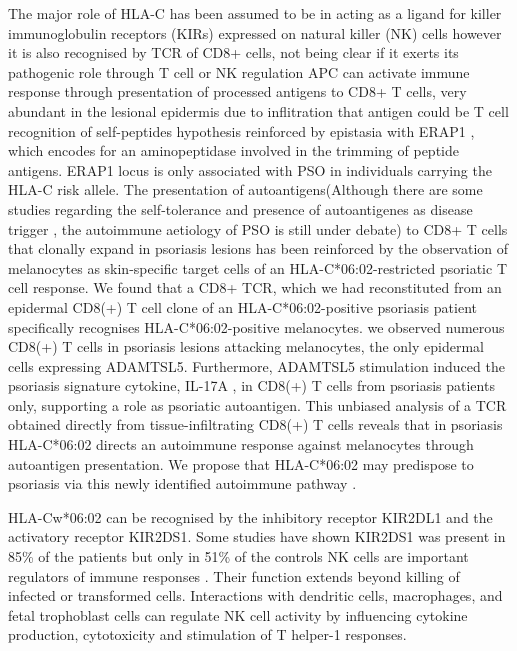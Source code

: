  The major role of HLA-C has been assumed to be in acting as a ligand for killer immunoglobulin receptors (KIRs) expressed on natural killer (NK) cells however it is also recognised by TCR of CD8+ cells, not being clear if it exerts its pathogenic role through T cell or NK regulation 
APC can activate immune response through presentation of processed antigens to CD8+ T cells, very abundant in the lesional epidermis due to inflitration that antigen could be T cell recognition of self-peptides hypothesis reinforced by epistasia with ERAP1 \parencite{Strange2010}, which encodes for an aminopeptidase involved in the trimming of peptide antigens. ERAP1  locus  is  only  associated  with  PSO  in  individuals carrying the HLA-C risk allele. The presentation of autoantigens(Although there are some studies regarding the self-tolerance and presence of autoantigenes as disease trigger \parencite{Lande2007}, the autoimmune aetiology of PSO is still under debate) to CD8+ T cells that clonally expand in psoriasis lesions has been reinforced by the observation of melanocytes as skin-specific target cells of an HLA-C*06:02-restricted psoriatic T cell response. We found that a CD8+ TCR, which we had reconstituted from an epidermal CD8(+) T cell clone of an HLA-C*06:02-positive psoriasis patient specifically recognises HLA-C*06:02-positive melanocytes. we observed numerous CD8(+) T cells in psoriasis lesions attacking melanocytes, the only epidermal cells expressing ADAMTSL5. Furthermore, ADAMTSL5 stimulation induced the psoriasis signature cytokine, IL-17A %
, in CD8(+) T cells from psoriasis patients only, supporting a role as psoriatic autoantigen. %
This unbiased analysis of a TCR obtained directly from tissue-infiltrating CD8(+) T cells reveals that in psoriasis HLA-C*06:02 directs an autoimmune response against melanocytes through autoantigen presentation. We propose that HLA-C*06:02 may predispose to psoriasis via this newly identified autoimmune pathway \parencite{Arakawa2015}.

HLA-Cw*06:02 can be recognised by the inhibitory receptor KIR2DL1 and the activatory receptor KIR2DS1.  Some studies have shown KIR2DS1 was present in 85\% of the patients but only in 51\% of the controls
NK cells are important regulators of immune responses \parencite{Luszczek2004}. Their function extends beyond killing of infected or transformed cells. Interactions with dendritic cells, macrophages, and fetal trophoblast cells can regulate NK cell activity by influencing cytokine production, cytotoxicity and stimulation of T helper-1 responses. 


